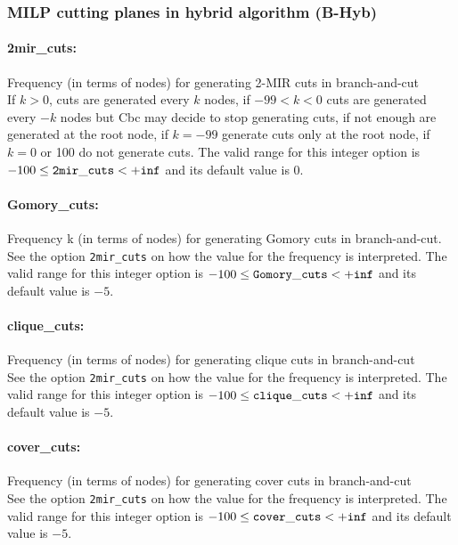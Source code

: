 \subsubsection{MILP cutting planes in hybrid algorithm (B-Hyb)}
\label{sec:MILP_cutting_planes_in_hybrid_algorithm_(B-Hyb)}

\paragraph{2mir\_cuts:}\label{sec:2mir_cuts} Frequency (in terms of nodes) for generating 2-MIR cuts in branch-and-cut $\;$ \\
 If $k > 0$, cuts are generated every $k$ nodes, if
$-99 < k < 0$ cuts are generated every $-k$ nodes but
Cbc may decide to stop generating cuts, if not
enough are generated at the root node, if $k=-99$
generate cuts only at the root node, if $k=0$ or
100 do not generate cuts. 
The valid range for this integer option is
$-100 \le {\tt 2mir\_cuts } <  {\tt +inf}$
and its default value is $0$.


\paragraph{Gomory\_cuts:}\label{sec:Gomory_cuts} Frequency k (in terms of nodes) for generating Gomory cuts in branch-and-cut. $\;$ \\
See the option \texttt{2mir\_cuts} on how the value for the frequency is interpreted.
The valid range for this integer option is
$-100 \le {\tt Gomory\_cuts } <  {\tt +inf}$
and its default value is $-5$.


\paragraph{clique\_cuts:}\label{sec:clique_cuts} Frequency (in terms of nodes) for generating clique cuts in branch-and-cut $\;$ \\
See the option \texttt{2mir\_cuts} on how the value for the frequency is interpreted.
The valid range for this integer option is
$-100 \le {\tt clique\_cuts } <  {\tt +inf}$
and its default value is $-5$.


\paragraph{cover\_cuts:}\label{sec:cover_cuts} Frequency (in terms of nodes) for generating cover cuts in branch-and-cut $\;$ \\
See the option \texttt{2mir\_cuts} on how the value for the frequency is interpreted.
The valid range for this integer option is
$-100 \le {\tt cover\_cuts } <  {\tt +inf}$
and its default value is $-5$.



